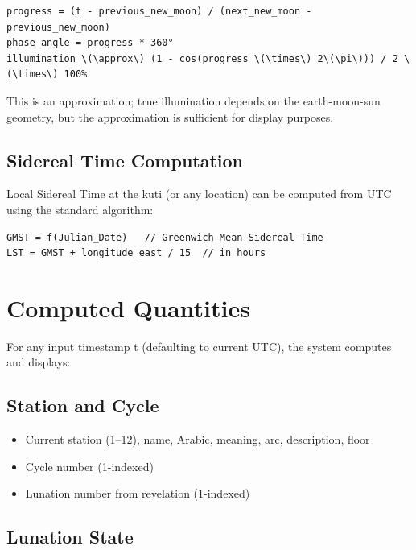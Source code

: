 \begin{lstlisting}
progress = (t - previous_new_moon) / (next_new_moon - previous_new_moon)
phase_angle = progress * 360°
illumination \(\approx\) (1 - cos(progress \(\times\) 2\(\pi\))) / 2 \(\times\) 100%
\end{lstlisting}

This is an approximation; true illumination depends on the earth-moon-sun geometry, but the approximation is sufficient for display purposes.

\hypertarget{sidereal-time-computation}{%
\subsection{Sidereal Time Computation}\label{sidereal-time-computation}}

Local Sidereal Time at the kuti (or any location) can be computed from UTC using the standard algorithm:

\begin{lstlisting}
GMST = f(Julian_Date)   // Greenwich Mean Sidereal Time
LST = GMST + longitude_east / 15  // in hours
\end{lstlisting}

\hypertarget{computed-quantities}{%
\section{Computed Quantities}\label{computed-quantities}}

For any input timestamp t (defaulting to current UTC), the system computes and displays:

\hypertarget{station-and-cycle}{%
\subsection{Station and Cycle}\label{station-and-cycle}}

\begin{itemize}
\tightlist
\item
  Current station (1--12), name, Arabic, meaning, arc, description, floor
\item
  Cycle number (1-indexed)
\item
  Lunation number from revelation (1-indexed)
\end{itemize}

\hypertarget{lunation-state}{%
\subsection{Lunation State}\label{lunation-state}}

